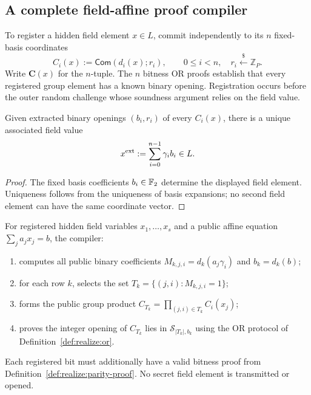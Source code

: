 \subsection{A complete field-affine proof compiler}\label{sec:realize:compiler}

\begin{definition}\label{def:realize:field-commit}
To register a hidden field element $x\in L$, commit
independently to its $n$ fixed-basis coordinates
\[
 C_i(x):=\mathsf{Com}(d_i(x);r_i),\qquad
 0\leq i<n,\quad r_i\overset{\$}{\leftarrow}\mathbb Z_P.
\]
Write $\mathbf C(x)$ for the $n$-tuple.
The $n$ bitness OR proofs establish that every
registered group element has a known binary opening.
Registration occurs before the outer random challenge
whose soundness argument relies on the field value.
\end{definition}

\begin{lemma}\label{lem:realize:field-reconstruct}
Given extracted binary openings $(b_i,r_i)$ of
every $C_i(x)$, there is a unique associated field value
\[
 x^{\rm ext}:=\sum_{i=0}^{n-1}\gamma_i b_i\in L.
\]
\end{lemma}
\begin{proof}
The fixed basis coefficients $b_i\in\mathbb{F}_2$ determine
the displayed field element. Uniqueness follows
from the uniqueness of basis expansions;
no second field element can have the same
coordinate vector.
\end{proof}

\begin{definition}\label{def:realize:affine-compiler}
For registered hidden field variables $x_1,\ldots,x_s$
and a public affine equation $\sum_ja_jx_j=b$,
the compiler:
\begin{enumerate}[label=\textup{(\roman*)}]
\item computes all public binary coefficients
$M_{k,j,i}=d_k(a_j\gamma_i)$ and $b_k=d_k(b)$;
\item for each row $k$, selects the set
$T_k=\{(j,i):M_{k,j,i}=1\}$;
\item forms the public group product
$C_{T_k}=\prod_{(j,i)\in T_k}C_i(x_j)$;
\item proves the integer opening of $C_{T_k}$
lies in $\mathcal S_{|T_k|,b_k}$
using the OR protocol of
Definition~\ref{def:realize:or}.
\end{enumerate}
Each registered bit must additionally have a valid
bitness proof from Definition~\ref{def:realize:parity-proof}.
No secret field element is transmitted or opened.
\end{definition}

